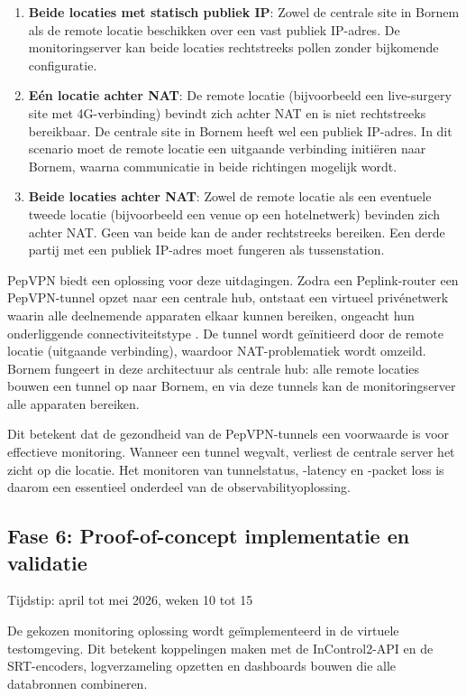 \begin{enumerate}
\item \textbf{Beide locaties met statisch publiek IP}: Zowel de centrale site in Bornem als de remote locatie beschikken over een vast publiek IP-adres. De monitoringserver kan beide locaties rechtstreeks pollen zonder bijkomende configuratie.

\item \textbf{Eén locatie achter NAT}: De remote locatie (bijvoorbeeld een live-surgery site met 4G-verbinding) bevindt zich achter NAT en is niet rechtstreeks bereikbaar. De centrale site in Bornem heeft wel een publiek IP-adres. In dit scenario moet de remote locatie een uitgaande verbinding initiëren naar Bornem, waarna communicatie in beide richtingen mogelijk wordt.

\item \textbf{Beide locaties achter NAT}: Zowel de remote locatie als een eventuele tweede locatie (bijvoorbeeld een venue op een hotelnetwerk) bevinden zich achter NAT. Geen van beide kan de ander rechtstreeks bereiken. Een derde partij met een publiek IP-adres moet fungeren als tussenstation.
\end{enumerate}

PepVPN biedt een oplossing voor deze uitdagingen. Zodra een Peplink-router een PepVPN-tunnel opzet naar een centrale hub, ontstaat een virtueel privénetwerk waarin alle deelnemende apparaten elkaar kunnen bereiken, ongeacht hun onderliggende connectiviteitstype \autocite{Peplink2023}. De tunnel wordt geïnitieerd door de remote locatie (uitgaande verbinding), waardoor NAT-problematiek wordt omzeild. Bornem fungeert in deze architectuur als centrale hub: alle remote locaties bouwen een tunnel op naar Bornem, en via deze tunnels kan de monitoringserver alle apparaten bereiken.

Dit betekent dat de gezondheid van de PepVPN-tunnels een voorwaarde is voor effectieve monitoring. Wanneer een tunnel wegvalt, verliest de centrale server het zicht op die locatie. Het monitoren van tunnelstatus, -latency en -packet loss is daarom een essentieel onderdeel van de observabilityoplossing.

\subsection{Fase 6: Proof-of-concept implementatie en validatie}

Tijdstip: april tot mei 2026, weken 10 tot 15

De gekozen monitoring oplossing wordt geïmplementeerd in de virtuele testomgeving. Dit betekent koppelingen maken met de InControl2-API en de SRT-encoders, logverzameling opzetten en dashboards bouwen die alle databronnen combineren.

